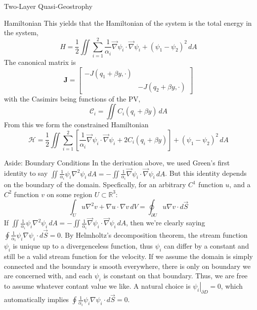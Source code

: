 \documentclass[12pt]{article}
\begin{document}
\begin{section}{Two-Layer Quasi-Geostrophy}
\begin{subsection}{Hamiltonian}
        This yields that the Hamiltonian of the system is the total energy in the system,
        $$
        H = \frac12 \iint \sum_{i=1}^2 \frac{1}{\alpha_i}\vec\nabla \psi_i \cdot \vec\nabla \psi_i + (\psi_1 - \psi_2)^2 \, dA
        $$
        The canonical matrix is
        $$
        \mathbf{J} = \left[\begin{array}{cc}
        -J(q_1 + \beta y, \cdot) & \\
        & -J(q_2 + \beta y, \cdot)
        \end{array}\right]
        $$
        with the Casimirs being functions of the PV,
        $$
        \mathcal{C}_i = \iint C_i(q_i + \beta y) \, dA
        $$
        From this we form the constrained Hamiltonian
        \begin{equation}
            \mathcal{H} = \frac12 \iint \sum_{i=1}^2 \left[ \frac{1}{\alpha_i} \vec\nabla \psi_i \cdot \vec\nabla \psi_i + 2C_i(q_i + \beta y) \right]+ (\psi_1 - \psi_2)^2 \, dA
            \label{eqn:qg_tl_h}
        \end{equation}

        \begin{subsubsection}{Aside: Boundary Conditions}
            In the derivation above, we used Green's first identity to say $\iint \frac{1}{\alpha_i}\psi_i \nabla^2 \psi_i \, dA = - \iint \frac{1}{\alpha_i} \vec\nabla\psi_i \cdot \vec\nabla\psi_i \, dA$. But this identity depends on the boundary of the domain. Specfically, for an arbitrary $C^1$ function $u$, and a $C^2$ function $v$ on some region $U \subset \mathbb{R}^3$:
            $$
            \int_U u \nabla^2 v + \nabla u \cdot \nabla v \, dV = \oint_{\partial U} u \nabla v \cdot d \vec S
            $$
            If $\iint \frac{1}{\alpha_i}\psi_i \nabla^2 \psi_i \, dA = - \iint \frac{1}{\alpha_i} \vec\nabla\psi_i \cdot \vec\nabla\psi_i \, dA$, then we're clearly saying $\oint \frac{1}{\alpha_i}\psi_i \nabla \psi_i\cdot d \vec S = 0$. By Helmholtz's decomposition theorem, the stream function $\psi_i$ is unique up to a divergenceless function, thus $\psi_i$ can differ by a constant and still be a valid stream function for the velocity. If we assume the domain is simply connected and the boundary is smooth everywhere, there is only on boundary we are concerned with, and each $\psi_i$ is constant on that boundary. Thus, we are free to assume whatever contant value we like. A natural choice is $\left. \psi_i \right|_{\partial D} = 0$, which automatically implies $\oint \frac{1}{\alpha_i}\psi_i \nabla \psi_i \cdot d \vec S = 0$.


\end{subsubsection}
\end{subsection}
\end{section}
\end{document}
